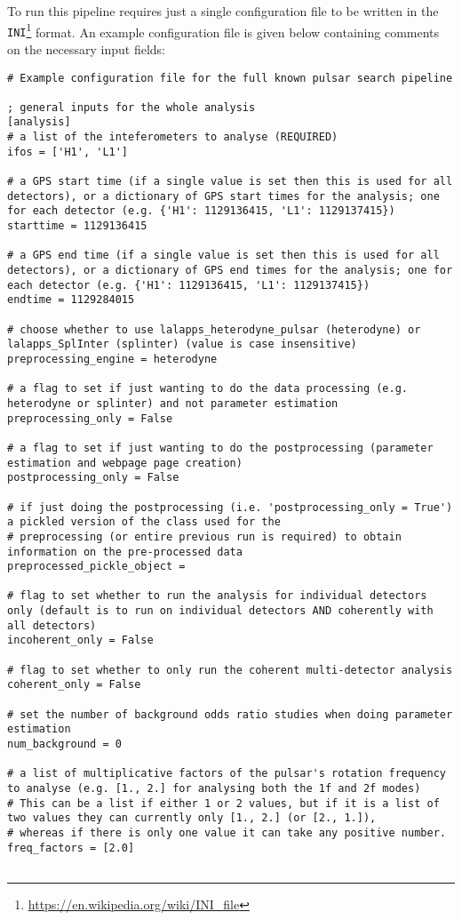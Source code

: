 To run this pipeline requires just a single configuration file to be written in the {\tt INI}\footnote{\url{https://en.wikipedia.org/wiki/INI_file}} format. An
example configuration file is given below containing comments on the necessary input fields:
\begin{lstlisting}[frame=single]
# Example configuration file for the full known pulsar search pipeline

; general inputs for the whole analysis
[analysis]
# a list of the inteferometers to analyse (REQUIRED)
ifos = ['H1', 'L1']

# a GPS start time (if a single value is set then this is used for all detectors), or a dictionary of GPS start times for the analysis; one for each detector (e.g. {'H1': 1129136415, 'L1': 1129137415})
starttime = 1129136415

# a GPS end time (if a single value is set then this is used for all detectors), or a dictionary of GPS end times for the analysis; one for each detector (e.g. {'H1': 1129136415, 'L1': 1129137415})
endtime = 1129284015

# choose whether to use lalapps_heterodyne_pulsar (heterodyne) or lalapps_SplInter (splinter) (value is case insensitive)
preprocessing_engine = heterodyne

# a flag to set if just wanting to do the data processing (e.g. heterodyne or splinter) and not parameter estimation
preprocessing_only = False

# a flag to set if just wanting to do the postprocessing (parameter estimation and webpage page creation)
postprocessing_only = False

# if just doing the postprocessing (i.e. 'postprocessing_only = True') a pickled version of the class used for the
# preprocessing (or entire previous run is required) to obtain information on the pre-processed data
preprocessed_pickle_object =

# flag to set whether to run the analysis for individual detectors only (default is to run on individual detectors AND coherently with all detectors)
incoherent_only = False

# flag to set whether to only run the coherent multi-detector analysis
coherent_only = False

# set the number of background odds ratio studies when doing parameter estimation
num_background = 0

# a list of multiplicative factors of the pulsar's rotation frequency to analyse (e.g. [1., 2.] for analysing both the 1f and 2f modes)
# This can be a list if either 1 or 2 values, but if it is a list of two values they can currently only [1., 2.] (or [2., 1.]),
# whereas if there is only one value it can take any positive number.
freq_factors = [2.0]


\end{lstlisting}
